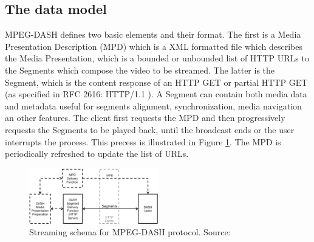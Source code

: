 \documentclass[openany]{book}
\begin{document}
\subsection{The data model}
MPEG-DASH \cite{MPEG} defines two basic elements and their format. The first is a Media Presentation Description (MPD) which is a XML formatted file which describes the Media Presentation, which is a bounded or unbounded list of HTTP URLs to the Segments which compose the video to be streamed. The latter is the Segment, which is the content response of an HTTP GET or partial HTTP GET (as specified in RFC 2616: HTTP/1.1 \cite{HTTP}). A Segment can contain both media data and metadata useful for segments alignment, synchronization, media navigation an other features. The client first requests the MPD and then progressively requests the Segments to be played back, until the broadcast ends or the user interrupts the process. This precess is illustrated in Figure \ref{fig:schema}. The MPD is periodically refreshed to update the list of URLs.
\begin{figure}[ht]
\centering
\includegraphics[width=0.5\textwidth]{DASH_schema.png}
\caption{\label{fig:schema}Streaming schema for MPEG-DASH protocol. Source: \cite{MPEG}}
\end{figure}
\end{document}
